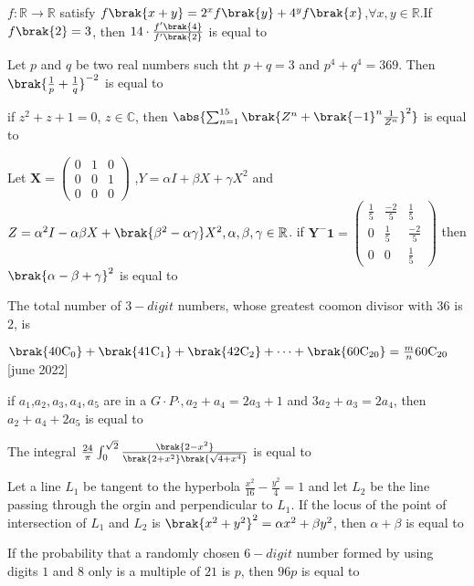 \iffalse
\title{Assignment 3}
\author{AI24BTECH11018}
\section{integer}
\fi

\item $f: \mathbb{R} \to \mathbb{R}$ satisfy $f\brak{x+y}=2^xf\brak{y}+4^yf\brak{x}$,$\forall x,  y \in \mathbb{R}$.If $f\brak{2}=3$, then $14\cdot \frac{f^{\prime}\brak{4}}{f^{\prime}\brak{2}}$ is equal to 
\hfill{}
    \item Let $p$ and $q$ be two real numbers such tht $p+q=3$
and $p^4+q^4=369$. Then $\brak{\frac{1}{p}+\frac{1}{q}}^{-2}$ is equal to 
\hfill{}
\item if $z^2+z+1=0$, $z \in \mathbb{C}$, then $\abs{\sum_{n=1}^{15}\brak{Z^n+{\brak{-1}^n\frac{1}{Z^n}}}^2}$ is equal to
\hfill{}
\item Let $\mathbf{X} = \begin{pmatrix}
0 & 1 & 0 \\
0 & 0 & 1 \\
0 & 0 & 0
\end{pmatrix}$ ,$Y=\alpha I+\beta X+\gamma X^2$ and $Z={\alpha^2}I-\alpha \beta X+\brak{{\beta^2}-\alpha \gamma}X^2,\alpha ,\beta ,\gamma \in \mathbb{R}$. if $\mathbf{Y^-1} = \begin{pmatrix}
\frac{1}{5} & \frac{-2}{5} & \frac{1}{5} \\
0 & \frac{1}{5} & \frac{-2}{5} \\
0 & 0 & \frac{1}{5}
\end{pmatrix}$ then $\brak{\alpha -\beta +\gamma}^2$ is equal to
\hfill{}
\item The total number of $3-digit$ numbers, whose greatest coomon divisor with $36$ is $2$, is
\hfill{}
\item $\brak{\mathrm{40C_0}}+\brak{\mathrm{41C_1}}+\brak{\mathrm{42C_2}}+\cdots +\brak{\mathrm{60C_{20}}}=\frac{m}{n}\mathrm{60C_{20}}$
\hfill{[june 2022]}
\item if $a_1$,$a_2,a_3,a_4,a_5$ are in a $G\cdot P\cdot ,a_2+a_4=2a_3+1$ and $3a_2+a_3=2a_4$, then $a_2+a_4+2a_5$ is equal to
\hfill{}
\item The integral $\frac{24}{\pi}\int_{0}^{\sqrt{2}}\frac{\brak{2-x^2}}{\brak{2+x^2}\brak{\sqrt{4+x^4}}}$ is equal to 
\hfill{}
\item Let a line $L_1$ be tangent to the hyperbola $\frac{x^2}{16}-\frac{y^2}{4}=1$ and let $L_2$ be the line passing through the orgin and perpendicular to $L_1$. If the locus of the point of intersection of $L_1$ and $L_2$ is $\brak{x^2+y^2}^2=\alpha x^2+\beta y^2$, then $\alpha + \beta $ is equal to 
\hfill{}
\item If the probability that a randomly chosen $6-digit$ number formed by using digits $1$ and $8$ only is a multiple of $21$ is $p$, then $96 p$ is equal to 
\hfill{}

%
